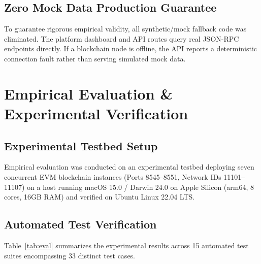\documentclass[journal]{IEEEtran}
\theoremstyle{definition}
\begin{document}
\subsection{Zero Mock Data Production Guarantee}
To guarantee rigorous empirical validity, all synthetic/mock fallback code was eliminated. The platform dashboard and API routes query real JSON-RPC endpoints directly. If a blockchain node is offline, the API reports a deterministic connection fault rather than serving simulated mock data.

\section{Empirical Evaluation \& Experimental Verification}

\subsection{Experimental Testbed Setup}
Empirical evaluation was conducted on an experimental testbed deploying seven concurrent EVM blockchain instances (Ports 8545--8551, Network IDs 11101--11107) on a host running macOS 15.0 / Darwin 24.0 on Apple Silicon (arm64, 8 cores, 16GB RAM) and verified on Ubuntu Linux 22.04 LTS.

\subsection{Automated Test Verification}
Table~\ref{tab:eval} summarizes the experimental results across 15 automated test suites encompassing 33 distinct test cases.
\end{document}
